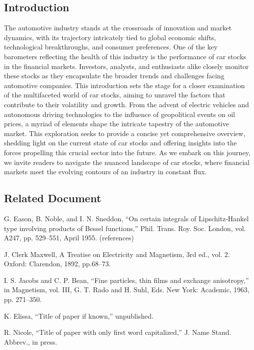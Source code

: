 \documentclass{ieeeojies}
\begin{document}
\subsection{Introduction}
\hspace{0.3cm} The automotive industry stands at the crossroads of
innovation and market dynamics, with its trajectory intricately
tied to global economic shifts, technological breakthroughs,
and consumer preferences. One of the key barometers
reflecting the health of this industry is the performance of car
stocks in the financial markets. Investors, analysts, and
enthusiasts alike closely monitor these stocks as they
encapsulate the broader trends and challenges facing
automotive companies. This introduction sets the stage for a
closer examination of the multifaceted world of car stocks,
aiming to unravel the factors that contribute to their volatility
and growth. From the advent of electric vehicles and
autonomous driving technologies to the influence of
geopolitical events on oil prices, a myriad of elements shape
the intricate tapestry of the automotive market. This
exploration seeks to provide a concise yet comprehensive
overview, shedding light on the current state of car stocks and
offering insights into the forces propelling this crucial sector
into the future. As we embark on this journey, we invite
readers to navigate the nuanced landscape of car stocks, where
financial markets meet the evolving contours of an industry in
constant flux.


\subsection{Related Document}
\hspace{0.3cm}G. Eason, B. Noble, and I. N. Sneddon, “On certain integrals of
Lipschitz-Hankel type involving products of Bessel functions,” Phil.
Trans. Roy. Soc. London, vol. A247, pp. 529–551, April 1955.
(references)

J. Clerk Maxwell, A Treatise on Electricity and Magnetism, 3rd ed., vol.
2. Oxford: Clarendon, 1892, pp.68–73.

I. S. Jacobs and C. P. Bean, “Fine particles, thin films and exchange
anisotropy,” in Magnetism, vol. III, G. T. Rado and H. Suhl, Eds. New
York: Academic, 1963, pp. 271–350.

K. Elissa, “Title of paper if known,” unpublished.

R. Nicole, “Title of paper with only first word capitalized,” J. Name
Stand. Abbrev., in press.
\end{document}
